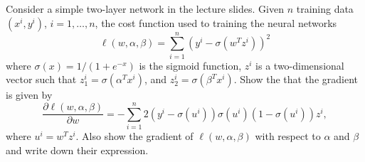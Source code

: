 \documentclass[twoside,10pt]{article}
\begin{document}
Consider a simple two-layer network in the lecture slides. Given $n$ training data $(x^i, y^i)$, $i = 1, \ldots, n$, the cost function used to training the neural networks
\[
\ell(w, \alpha, \beta) = \sum_{i=1}^n (y^i - \sigma(w^T z^i))^2
\]
where $\sigma (x) = 1/(1+e^{-x})$ is the sigmoid function, $z^i$ is a two-dimensional vector such that  $z_1^i = \sigma(\alpha^T x^i)$, and $z_2^i = \sigma(\beta^T x^i)$. Show the that the gradient is given by
\[
\frac{\partial \ell(w, \alpha, \beta) }{\partial w}
= - \sum_{i=1}^n 2(y^i - \sigma(u^i))\sigma(u^i)(1-\sigma(u^i)) z^i,
\]
where $u^i = w^T z^i$. Also show the gradient of $\ell(w, \alpha, \beta)$ with respect to $\alpha$ and $\beta$ and write down their expression.
\end{document}
